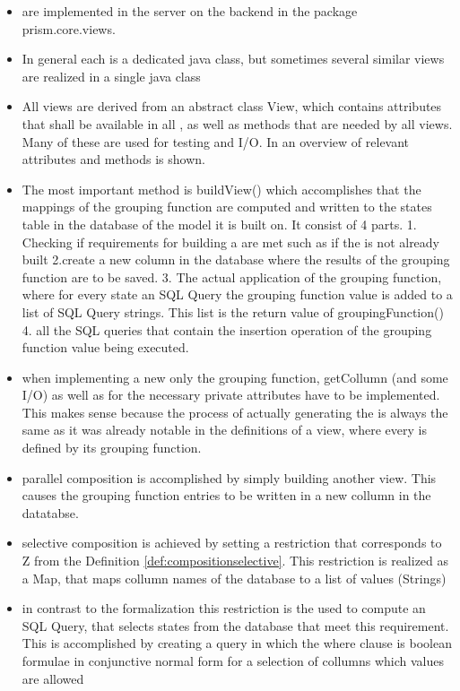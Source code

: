 \documentclass[preview]{standalone}
\begin{document}
\begin{itemize}
		\item \viewsN are implemented in the server on the backend in the package prism.core.views.
		\item In general each \viewN is a dedicated java class, but sometimes several similar views are realized in a single java class
		\item All views are derived from an abstract class View, which contains attributes that shall be available in all \viewsN, as well as methods that are needed by all views. Many of these are used for testing and I/O. In  an overview of relevant attributes and methods is shown.	
		\item The most important method is buildView() which accomplishes that the mappings of the grouping function are computed and written to the states table in the database of the model it is built on. It consist of 4 parts. 1. Checking if requirements for building a \viewN are met such as if the \viewN is not already built 2.create a new column in the database where the results of the grouping function are to be saved. 3. The actual application of the grouping function, where for every state an SQL Query the grouping function value is added to a list of SQL Query strings. This list is the return value of groupingFunction() 4. all the SQL queries that contain the insertion operation of the grouping function value being executed.
		\item when implementing a new \viewN only the grouping function, getCollumn (and some I/O) as well as for the \viewN necessary private attributes have to be implemented. This makes sense because the process of actually generating the \viewN is always the same as it was already notable in the definitions of a view, where every \viewN is defined by its grouping function.
		\item parallel composition is accomplished by simply building another view. This causes the grouping function entries to be written in a new collumn in the datatabse.
		\item selective composition is achieved by setting a restriction that corresponds to Z from the Definition \ref{def:compositionselective}. This restriction is realized as a Map, that maps collumn names of the database to a list of values (Strings)
		\item in contrast to the formalization this restriction is the used to compute an SQL Query, that selects states from the database that meet this requirement. This is accomplished by creating a query in which the where clause is boolean formulae in conjunctive normal form for a selection of collumns which values are allowed

\end{itemize}
\end{document}
